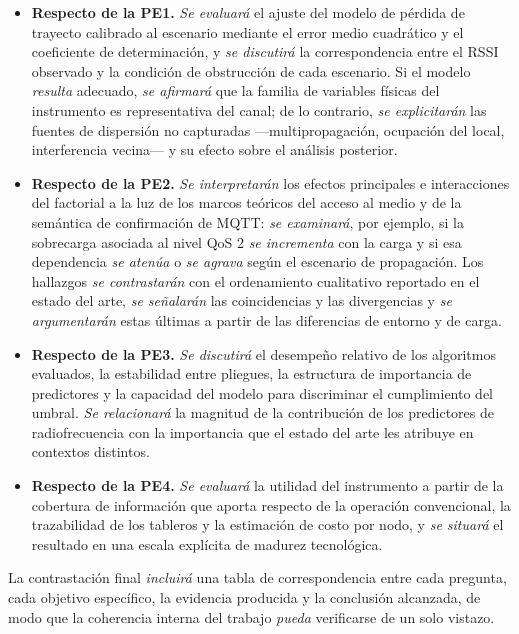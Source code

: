 \documentclass[
  12pt,
]{article}
\providecommand{\tightlist}{%
  \setlength{\itemsep}{0pt}\setlength{\parskip}{0pt}}
\begin{document}
\begin{itemize}
\tightlist
\item
  \textbf{Respecto de la PE1.} \emph{Se evaluará} el ajuste del modelo
  de pérdida de trayecto calibrado al escenario mediante el error medio
  cuadrático y el coeficiente de determinación, y \emph{se discutirá} la
  correspondencia entre el RSSI observado y la condición de obstrucción
  de cada escenario. Si el modelo \emph{resulta} adecuado, \emph{se
  afirmará} que la familia de variables físicas del instrumento es
  representativa del canal; de lo contrario, \emph{se explicitarán} las
  fuentes de dispersión no capturadas —multipropagación, ocupación del
  local, interferencia vecina— y su efecto sobre el análisis posterior.
\item
  \textbf{Respecto de la PE2.} \emph{Se interpretarán} los efectos
  principales e interacciones del factorial a la luz de los marcos
  teóricos del acceso al medio y de la semántica de confirmación de
  MQTT: \emph{se examinará}, por ejemplo, si la sobrecarga asociada al
  nivel QoS 2 \emph{se incrementa} con la carga y si esa dependencia
  \emph{se atenúa} o \emph{se agrava} según el escenario de propagación.
  Los hallazgos \emph{se contrastarán} con el ordenamiento cualitativo
  reportado en el estado del arte, \emph{se señalarán} las coincidencias
  y las divergencias y \emph{se argumentarán} estas últimas a partir de
  las diferencias de entorno y de carga.
\item
  \textbf{Respecto de la PE3.} \emph{Se discutirá} el desempeño relativo
  de los algoritmos evaluados, la estabilidad entre pliegues, la
  estructura de importancia de predictores y la capacidad del modelo
  para discriminar el cumplimiento del umbral. \emph{Se relacionará} la
  magnitud de la contribución de los predictores de radiofrecuencia con
  la importancia que el estado del arte les atribuye en contextos
  distintos.
\item
  \textbf{Respecto de la PE4.} \emph{Se evaluará} la utilidad del
  instrumento a partir de la cobertura de información que aporta
  respecto de la operación convencional, la trazabilidad de los tableros
  y la estimación de costo por nodo, y \emph{se situará} el resultado en
  una escala explícita de madurez tecnológica.
\end{itemize}

La contrastación final \emph{incluirá} una tabla de correspondencia
entre cada pregunta, cada objetivo específico, la evidencia producida y
la conclusión alcanzada, de modo que la coherencia interna del trabajo
\emph{pueda} verificarse de un solo vistazo.
\end{document}
